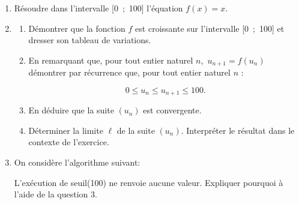 \documentclass[10pt]{article}
\begin{document}
\begin{enumerate}[resume]
\item Résoudre dans l'intervalle [0~;~100] l'équation $f(x) = x$.
\item
	\begin{enumerate}
		\item Démontrer que la fonction $f$ est croissante sur l'intervalle [0~;~100] et dresser son tableau de variations.
		\item En remarquant que, pour tout entier naturel $n$,\, $u_{n+1} = f\left(u_n\right)$ démontrer par récurrence que, pour tout entier naturel $n$ :

\[0 \leqslant u_n \leqslant u_{n+1} \leqslant 100.\]

		\item En déduire que la suite $\left(u_n\right)$ est convergente.
		\item Déterminer la limite $\ell$ de la suite $\left(u_n\right)$. Interpréter le résultat dans le contexte de l'exercice.
	\end{enumerate}
\item On considère l'algorithme suivant:

\begin{center}
\end{center}

L'exécution de seuil(100) ne renvoie aucune valeur. Expliquer pourquoi à l'aide de la question 3.
\end{enumerate}

\bigskip
\end{document}
